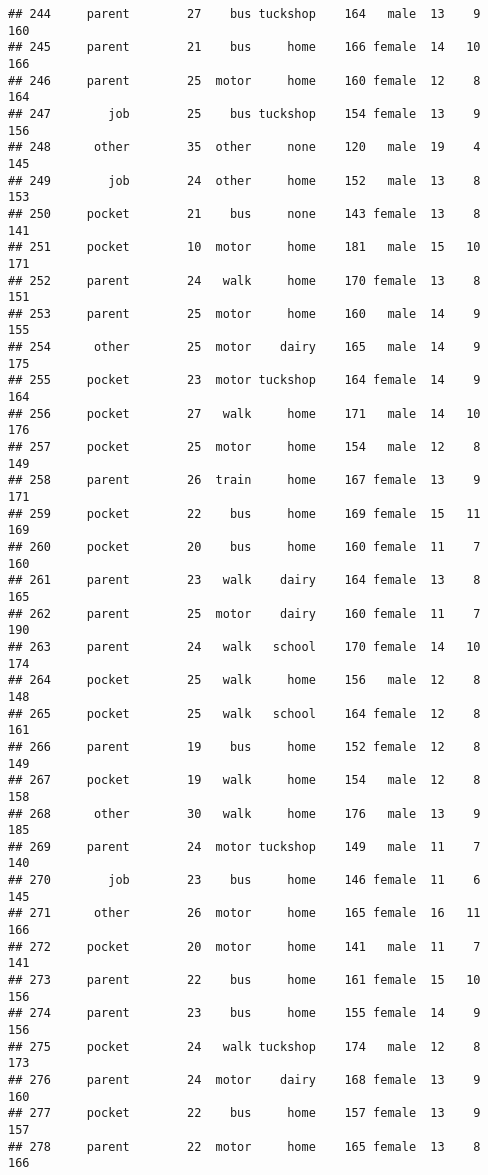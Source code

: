 \documentclass[
]{article}
\begin{document}
\begin{verbatim}
## 244     parent        27    bus tuckshop    164   male  13    9     160
## 245     parent        21    bus     home    166 female  14   10     166
## 246     parent        25  motor     home    160 female  12    8     164
## 247        job        25    bus tuckshop    154 female  13    9     156
## 248      other        35  other     none    120   male  19    4     145
## 249        job        24  other     home    152   male  13    8     153
## 250     pocket        21    bus     none    143 female  13    8     141
## 251     pocket        10  motor     home    181   male  15   10     171
## 252     parent        24   walk     home    170 female  13    8     151
## 253     parent        25  motor     home    160   male  14    9     155
## 254      other        25  motor    dairy    165   male  14    9     175
## 255     pocket        23  motor tuckshop    164 female  14    9     164
## 256     pocket        27   walk     home    171   male  14   10     176
## 257     pocket        25  motor     home    154   male  12    8     149
## 258     parent        26  train     home    167 female  13    9     171
## 259     pocket        22    bus     home    169 female  15   11     169
## 260     pocket        20    bus     home    160 female  11    7     160
## 261     parent        23   walk    dairy    164 female  13    8     165
## 262     parent        25  motor    dairy    160 female  11    7     190
## 263     parent        24   walk   school    170 female  14   10     174
## 264     pocket        25   walk     home    156   male  12    8     148
## 265     pocket        25   walk   school    164 female  12    8     161
## 266     parent        19    bus     home    152 female  12    8     149
## 267     pocket        19   walk     home    154   male  12    8     158
## 268      other        30   walk     home    176   male  13    9     185
## 269     parent        24  motor tuckshop    149   male  11    7     140
## 270        job        23    bus     home    146 female  11    6     145
## 271      other        26  motor     home    165 female  16   11     166
## 272     pocket        20  motor     home    141   male  11    7     141
## 273     parent        22    bus     home    161 female  15   10     156
## 274     parent        23    bus     home    155 female  14    9     156
## 275     pocket        24   walk tuckshop    174   male  12    8     173
## 276     parent        24  motor    dairy    168 female  13    9     160
## 277     pocket        22    bus     home    157 female  13    9     157
## 278     parent        22  motor     home    165 female  13    8     166

\end{verbatim}
\end{document}
